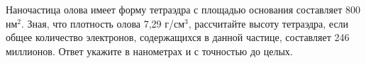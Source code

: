 
Наночастица
олова имеет форму тетраэдра с площадью основания составляет 800 нм$^2$.  Зная, что плотность олова 7,29 
г/см$^3$, рассчитайте высоту тетраэдра, если общее количество электронов,
содержащихся в данной частице, составляет 246 миллионов. 
Ответ укажите в нанометрах и с точностью до целых.



